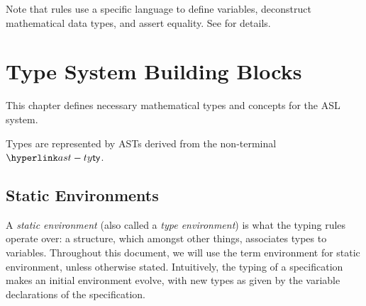 Note that rules use a specific language to define variables, deconstruct mathematical data types,
and assert equality. See  for details.

\chapter{Type System Building Blocks}
\label{chap:typesystembuildingblocks}
This chapter defines necessary mathematical types and concepts for the ASL system.

Types are represented by ASTs derived from the non-terminal $\ty$.

\section{Static Environments \label{sec:StaticEnvironments}}

A \emph{static environment} (also called a \emph{type environment}) is what the typing rules operate over:
a structure, which amongst other things, associates types to variables.
Throughout this document, we will use the term environment for static environment, unless otherwise stated.
Intuitively, the typing of a
specification makes an initial environment evolve, with new types as given by the
variable declarations of the specification.


